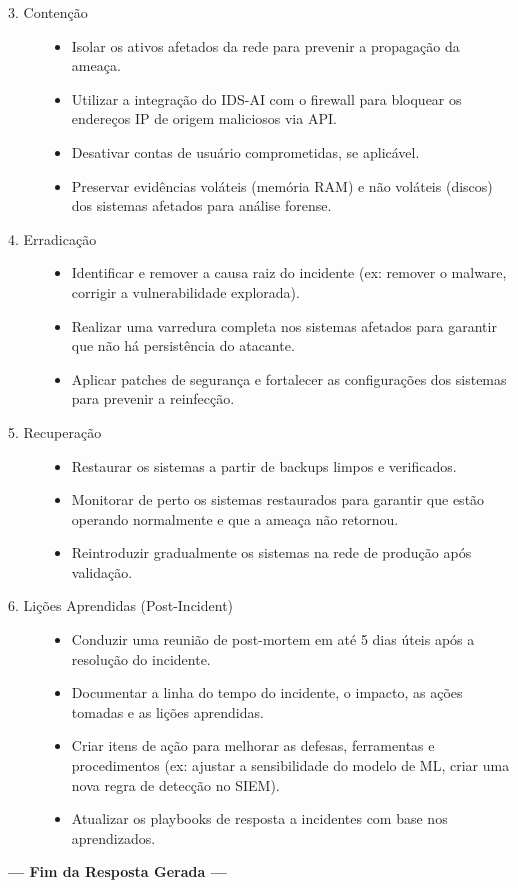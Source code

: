 \documentclass[a4paper,12pt]{article}
\begin{document}
\begin{description}
    \item[3. Contenção]
    \begin{itemize}
        \item Isolar os ativos afetados da rede para prevenir a propagação da ameaça.
        \item Utilizar a integração do IDS-AI com o firewall para bloquear os endereços IP de origem maliciosos via API.
        \item Desativar contas de usuário comprometidas, se aplicável.
        \item Preservar evidências voláteis (memória RAM) e não voláteis (discos) dos sistemas afetados para análise forense.
    \end{itemize}

    \item[4. Erradicação]
    \begin{itemize}
        \item Identificar e remover a causa raiz do incidente (ex: remover o malware, corrigir a vulnerabilidade explorada).
        \item Realizar uma varredura completa nos sistemas afetados para garantir que não há persistência do atacante.
        \item Aplicar patches de segurança e fortalecer as configurações dos sistemas para prevenir a reinfecção.
    \end{itemize}
    
    \item[5. Recuperação]
    \begin{itemize}
        \item Restaurar os sistemas a partir de backups limpos e verificados.
        \item Monitorar de perto os sistemas restaurados para garantir que estão operando normalmente e que a ameaça não retornou.
        \item Reintroduzir gradualmente os sistemas na rede de produção após validação.
    \end{itemize}

    \item[6. Lições Aprendidas (Post-Incident)]
    \begin{itemize}
        \item Conduzir uma reunião de post-mortem em até 5 dias úteis após a resolução do incidente.
        \item Documentar a linha do tempo do incidente, o impacto, as ações tomadas e as lições aprendidas.
        \item Criar itens de ação para melhorar as defesas, ferramentas e procedimentos (ex: ajustar a sensibilidade do modelo de ML, criar uma nova regra de detecção no SIEM).
        \item Atualizar os playbooks de resposta a incidentes com base nos aprendizados.
    \end{itemize}
\end{description}
\begin{center}
    \textbf{--- Fim da Resposta Gerada ---}
\end{center}
\end{document}

